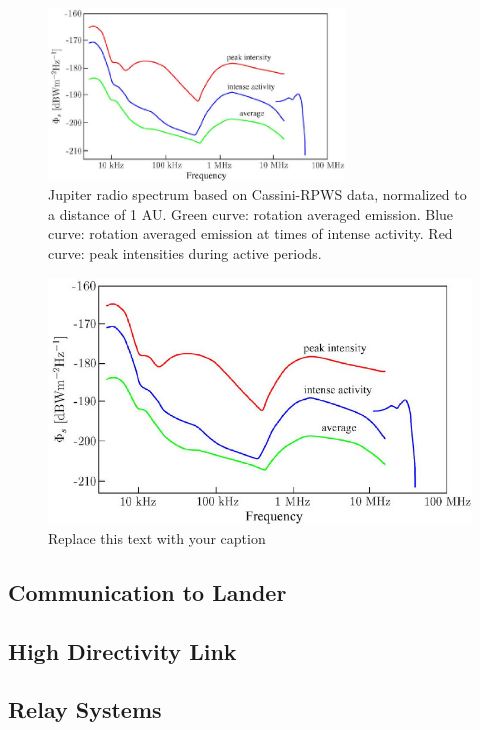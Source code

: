 \begin{figure}[htb]
\centering
\includegraphics[width=0.7\textwidth]{figures/below100.jpg}
\caption{Jupiter radio spectrum based on Cassini-RPWS data,
normalized to a distance of 1 AU. Green curve: rotation averaged
emission. Blue curve: rotation averaged emission at times of intense
activity. Red curve: peak intensities during active periods. \cite{Grie_meier_2005}}
\label{fig:J_spec}
\end{figure}


\begin{figure}[htb]
\begin{center}
\includegraphics[width=0.7\columnwidth]{figures/below100}
\caption{Replace this text with your caption%
}
\end{center}
\end{figure}

\subsection{Communication to Lander}

\subsection{High Directivity Link}

\subsection{Relay Systems}
